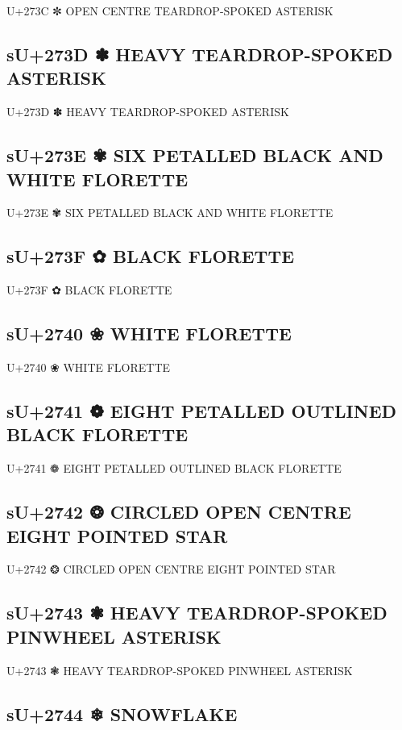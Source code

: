 U+273C ✼ OPEN CENTRE TEARDROP-SPOKED ASTERISK

\subsection{sU+273D ✽ HEAVY TEARDROP-SPOKED ASTERISK}

U+273D ✽ HEAVY TEARDROP-SPOKED ASTERISK

\subsection{sU+273E ✾ SIX PETALLED BLACK AND WHITE FLORETTE}

U+273E ✾ SIX PETALLED BLACK AND WHITE FLORETTE

\subsection{sU+273F ✿ BLACK FLORETTE}

U+273F ✿ BLACK FLORETTE

\subsection{sU+2740 ❀ WHITE FLORETTE}

U+2740 ❀ WHITE FLORETTE

\subsection{sU+2741 ❁ EIGHT PETALLED OUTLINED BLACK FLORETTE}

U+2741 ❁ EIGHT PETALLED OUTLINED BLACK FLORETTE

\subsection{sU+2742 ❂ CIRCLED OPEN CENTRE EIGHT POINTED STAR}

U+2742 ❂ CIRCLED OPEN CENTRE EIGHT POINTED STAR

\subsection{sU+2743 ❃ HEAVY TEARDROP-SPOKED PINWHEEL ASTERISK}

U+2743 ❃ HEAVY TEARDROP-SPOKED PINWHEEL ASTERISK

\subsection{sU+2744 ❄ SNOWFLAKE}


